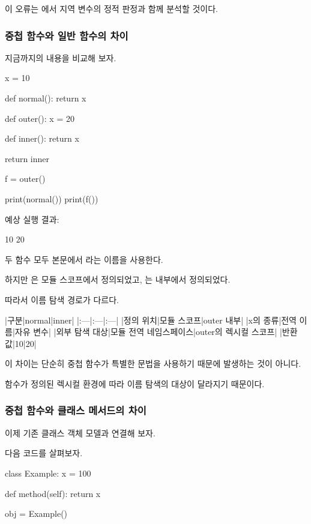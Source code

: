 이 오류는 에서 지역 변수의 정적 판정과 함께 분석할 것이다.

\subsubsection{중첩 함수와 일반 함수의 차이}

지금까지의 내용을 비교해 보자.

\begin{dhkcode}
x = 10

def normal():
    return x

def outer():
    x = 20

    def inner():
        return x

    return inner

f = outer()

print(normal())
print(f())
\end{dhkcode}

예상 실행 결과:

\begin{dhkzsh}
10
20
\end{dhkzsh}

두 함수 모두 본문에서 라는 이름을 사용한다.

하지만 은 모듈 스코프에서 정의되었고, 는  내부에서 정의되었다.

따라서 이름 탐색 경로가 다르다.

\begin{dhktable}
|구분|normal|inner|
|:---|:---|:---|
|정의 위치|모듈 스코프|outer 내부|
|x의 종류|전역 이름|자유 변수|
|외부 탐색 대상|모듈 전역 네임스페이스|outer의 렉시컬 스코프|
|반환값|10|20|
\end{dhktable}

이 차이는 단순히 중첩 함수가 특별한 문법을 사용하기 때문에 발생하는 것이 아니다.

함수가 정의된 렉시컬 환경에 따라 이름 탐색의 대상이 달라지기 때문이다.

\subsubsection{중첩 함수와 클래스 메서드의 차이}

이제 기존 클래스 객체 모델과 연결해 보자.

다음 코드를 살펴보자.

\begin{dhkcode}
class Example:
    x = 100

    def method(self):
        return x

obj = Example()
\end{dhkcode}

